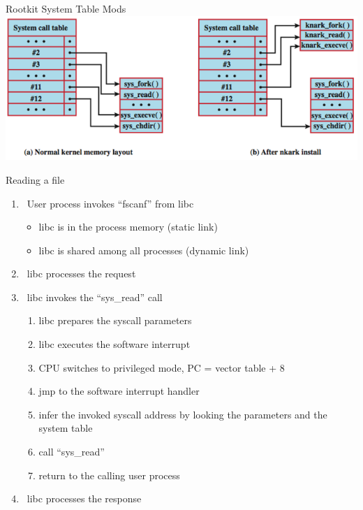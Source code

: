 \documentclass{beamer}
\begin{document}
\begin{frame}{Rootkit System Table Mods}
\includegraphics[width=0.8\linewidth]{rootkit}
\end{frame}

\begin{frame}{Reading a file}
  \begin{enumerate}
  \item  User process invokes ``fscanf'' from libc
  \begin{itemize}
    \item \alert<2>{libc is in the process memory (static link)}
    \item \alert<3>{libc is shared among all processes (dynamic link)}
  \end{itemize}
  \item  \alert<2-3>{libc processes the request}
  \item  libc invokes the ``sys\_read'' call
    \begin{enumerate}
      \item \alert<2-3>{libc prepares the syscall parameters}
      \item \alert<2-3>{libc executes the software interrupt}
      \item \alert<7>{CPU switches to privileged mode, PC = vector table + 8}
      \item \alert<4>{jmp to the software interrupt handler}
      \item \alert<6>{infer the invoked syscall address by looking the
        parameters and the system table}
      \item \alert<5>{call ``sys\_read''}
      \item return to the calling user process
    \end{enumerate}
  \item  \alert<2-3>{libc processes the response}
  \end{enumerate}
\end{frame}


\end{document}
